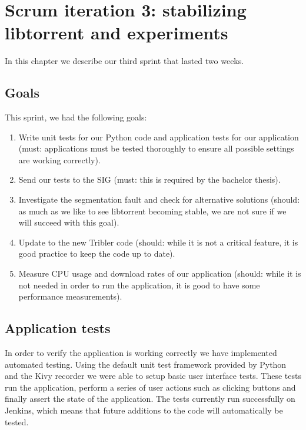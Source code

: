 \chapter{Scrum iteration 3: stabilizing libtorrent and experiments}
\label{cpt:iteration3}
	In this chapter we describe our third sprint that lasted two weeks.

	\section{Goals}
		This sprint, we had the following goals:
	
		\begin{enumerate}
			\item Write unit tests for our Python code and application tests for our application (must: applications must be tested thoroughly to ensure all possible settings are working correctly). 
			\item Send our tests to the SIG (must: this is required by the bachelor thesis).
			\item Investigate the segmentation fault and check for alternative solutions (should: as much as we like to see libtorrent becoming stable, we are not sure if we will succeed with this goal).
			\item Update to the new Tribler code (should: while it is not a critical feature, it is good practice to keep the code up to date).
			\item Measure CPU usage and download rates of our application (should: while it is not needed in order to run the application, it is good to have some performance measurements).
		\end{enumerate}
		
	\section{Application tests}
		In order to verify the application is working correctly we have implemented automated testing. Using the default unit test framework provided by Python and the Kivy recorder we were able to setup basic user interface tests. These tests run the application, perform a series of user actions such as clicking buttons and finally assert the state of the application. The tests currently run successfully on Jenkins, which means that future additions to the code will automatically be tested.
		
